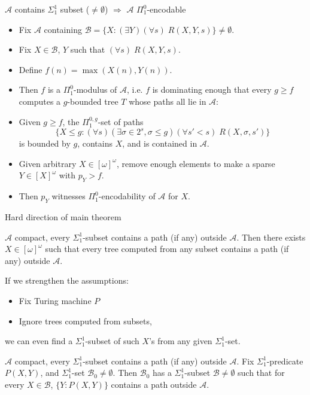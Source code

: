 \begin{frame}{$\mathcal{A}$ contains $\Sigma_1^1$ subset ($\neq\emptyset$)
$\Rightarrow$ $\mathcal{A}$ $\Pi_1^0$-encodable}
  \begin{itemize}
    \item Fix $\mathcal{A}$ containing $\mathcal{B} =\{X: (\exists
      Y)(\forall s)\; R(X,Y,s)\} \neq\emptyset$.
    \item Fix $X\in\mathcal{B}$, $Y$ such that $(\forall s)\;R(X,Y,s)$.
    \item Define $f(n)=\max(X(n),Y(n))$.
    \item Then $f$ is a $\Pi_1^0$-modulus of $\mathcal{A}$, i.e. $f$ is
      dominating enough that every $g\geq f$ computes a $g$-bounded tree
      $T$ whose paths all lie in $\mathcal{A}$:
    \item Given $g\geq f$, the $\Pi_1^{0,g}$-set of paths
      \[\{X\leq g:(\forall s)(\exists \sigma\in 2^s, \sigma\leq g)(\forall
      s'<s)\; R(X,\sigma,s')\}\]
      is bounded by $g$, contains $X$, and is contained in $\mathcal{A}$.
    \item Given arbitrary $X\in[\omega]^\omega$, remove enough elements to
      make a sparse $Y\in[X]^\omega$ with $p_Y>f$.
    \item Then $p_Y$ witnesses $\Pi_1^0$-encodability of $\mathcal{A}$ for
      $X$.
  \end{itemize}
\end{frame}

\begin{frame}{Hard direction of main theorem}
  \begin{main-thm*}
    $\mathcal{A}$ compact, every $\Sigma_1^1$-subset contains a path
    (if any) outside $\mathcal{A}$. Then there exists $X\in[\omega]^\omega$
    such that every tree computed from any subset contains a path (if any)
    outside $\mathcal{A}$.
  \end{main-thm*}

  If we strengthen the assumptions:
  \begin{itemize}
    \item Fix Turing machine $P$
    \item Ignore trees computed from subsets,
  \end{itemize}
  we can even find a $\Sigma_1^1$-subset of such $X$'s from any given
  $\Sigma_1^1$-set.

  \begin{claim}
    $\mathcal{A}$ compact, every $\Sigma_1^{1}$-subset contains a
    path (if any) outside $\mathcal{A}$. Fix $\Sigma_1^{1}$-predicate
    $P(X,Y)$, and $\Sigma_1^{1}$-set $\mathcal{B}_0\neq\emptyset$. Then
    $\mathcal{B}_0$ has a $\Sigma_1^{1}$-subset $\mathcal{B}\neq\emptyset$
    such that for every $X\in\mathcal{B}$, $\{Y:P(X,Y)\}$ contains a path
    outside $\mathcal{A}$.
  \end{claim}
\end{frame}

